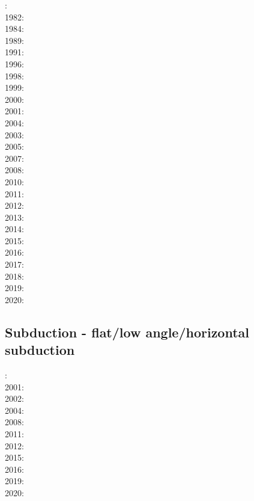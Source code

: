 {\scriptsize
{}: \cite{bird78}\\
1982: \cite{clwv82}\\
1984: \cite{cade84}\\
1989: \cite{clwv89}\\
1991: \cite{muph91}\\
1996: \cite{kest96}\\
1998: \cite{togu98}\\
1999: \cite{fagd99}\\
2000: \cite{pybf00}\\
2001: \cite{dohe01}\cite{reyb01}\cite{brry01}\\
2004: \cite{ster04}\cite{guhl04}\cite{solo04}\\
2003: \cite{hags03}\\
2005: \cite{bihi05}\\
2007: \cite{kore07}\\
2008: \cite{uegs08}\\
2010: \cite{nigm10}\cite{bucl10}\\
2011: \cite{bagw11}\cite{nigm11}\cite{legu11}\\
2012: \cite{stri12}\cite{thka12}\cite{lega12}\cite{shch12}\\
2013: \cite{dyge13}\cite{mana13}\cite{kore13}\cite{mibg13}\\
2014: \cite{recf14}\cite{macg14}\cite{crta14}\\
2015: \cite{matv15}\cite{pebu15}\cite{vapm15}\cite{legu15}\cite{gesb15}\\
2016: \cite{crta16}\cite{maka16}\cite{bags16}\\
2017: \cite{magm17}\\
2018: \cite{zhlg18}\cite{basq18}\\
2019: \cite{begb19}\cite{gubg19}\cite{ulcw19}\cite{gubg19}\\
2020: \cite{arla20}\cite{zhlg20}
}

\subsection{Subduction - flat/low angle/horizontal subduction}

{\scriptsize
{}: \cite{vavv00}\\
2001: \cite{vavv01}\\
2002: \cite{vavv02}\cite{vavv02b}\\
2004: \cite{vavv04d}\\
2008: \cite{pekh08}\cite{esfm08}\\
2011: \cite{cube11}\\
2012: \cite{mapm12}\cite{ronb12}\\
2015: \cite{gehm15}\cite{tarn15}\cite{ealw15}\\
2016: \cite{chdf16}\cite{huwc16}\cite{hulh16}\\
2019: \cite{sifg19}\cite{sams19b}\cite{malg19}\\
2020: \cite{dawl20}
}
